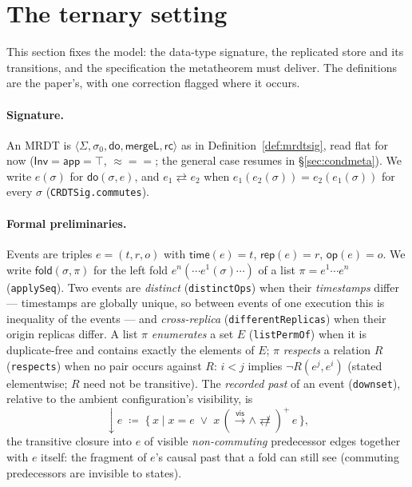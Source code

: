 \documentclass[11pt]{article}
\newcommand{\vis}{\xrightarrow{\mathsf{vis}}}
\newcommand{\rcrel}{\mathsf{rc}}                 %
\newcommand{\comm}{\rightleftarrows}
\newcommand{\ncomm}{\not\rightleftarrows}
\newcommand{\mergeL}{\mathsf{mergeL}}
\newcommand{\Sinit}{\sigma_0}
\newcommand{\dow}[1]{{\downarrow}#1}
\newcommand{\lean}[1]{\texttt{#1}}
\newcommand{\eqobs}{\approx}
\newcommand{\fold}{\mathsf{fold}}
\newcommand{\Inv}{\mathsf{Inv}}
\newcommand{\app}{\mathsf{app}}
\begin{document}
\section{The ternary setting}
\label{sec:setting}

This section fixes the model: the data-type signature, the replicated
store and its transitions, and the specification the metatheorem must
deliver. The definitions are the paper's, with one correction flagged
where it occurs.

\paragraph{Signature.} An MRDT is $\langle \Sigma, \Sinit, \mathsf{do},
\mergeL, \rcrel\rangle$ as in Definition~\ref{def:mrdtsig}, read flat
for now ($\Inv = \app = \top$, ${\eqobs} = {=}$; the general case
resumes in \S\ref{sec:condmeta}). We write $e(\sigma)$ for
$\mathsf{do}(\sigma,e)$, and $e_1 \comm e_2$ when
$e_1(e_2(\sigma)) = e_2(e_1(\sigma))$ for every $\sigma$
(\lean{CRDTSig.commutes}).

\paragraph{Formal preliminaries.} Events are triples $e = (t,r,o)$ with
$\mathsf{time}(e) = t$, $\mathsf{rep}(e) = r$, $\mathsf{op}(e) = o$. We
write $\fold(\sigma, \pi)$ for the left fold
$e^n(\cdots e^1(\sigma)\cdots)$ of a list $\pi = e^1 \cdots e^n$
(\lean{applySeq}). Two events are \emph{distinct}
(\lean{distinctOps}) when their \emph{timestamps} differ --- timestamps
are globally unique, so between events of one execution this is
inequality of the events --- and \emph{cross-replica}
(\lean{differentReplicas}) when their origin replicas differ. A list
$\pi$ \emph{enumerates} a set $E$ (\lean{listPermOf}) when it is
duplicate-free and contains exactly the elements of $E$; $\pi$
\emph{respects} a relation $R$ (\lean{respects}) when no pair occurs
against $R$: $i < j$ implies $\neg R(e^j, e^i)$ (stated elementwise;
$R$ need not be transitive). The \emph{recorded past} of an event
(\lean{downset}), relative to the ambient configuration's visibility,
is
\[
  \dow{e} \;\coloneqq\;
  \{\, x \mid x = e \;\vee\; x \,({\vis} \wedge {\ncomm})^{+}\, e \,\},
\]
the transitive closure into $e$ of visible \emph{non-commuting}
predecessor edges together with $e$ itself: the fragment of $e$'s causal
past that a fold can still see (commuting predecessors are invisible to
states).
\end{document}
